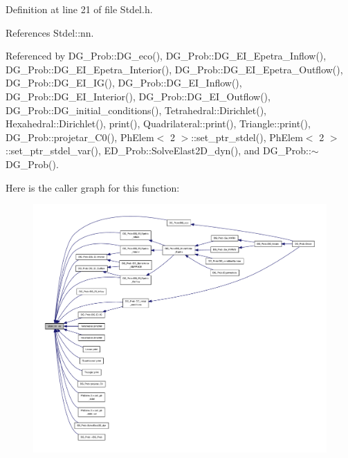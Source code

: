 Definition at line 21 of file Stdel.\+h.



References Stdel\+::nn.



Referenced by D\+G\+\_\+\+Prob\+::\+D\+G\+\_\+eco(), D\+G\+\_\+\+Prob\+::\+D\+G\+\_\+\+E\+I\+\_\+\+Epetra\+\_\+\+Inflow(), D\+G\+\_\+\+Prob\+::\+D\+G\+\_\+\+E\+I\+\_\+\+Epetra\+\_\+\+Interior(), D\+G\+\_\+\+Prob\+::\+D\+G\+\_\+\+E\+I\+\_\+\+Epetra\+\_\+\+Outflow(), D\+G\+\_\+\+Prob\+::\+D\+G\+\_\+\+E\+I\+\_\+\+I\+G(), D\+G\+\_\+\+Prob\+::\+D\+G\+\_\+\+E\+I\+\_\+\+Inflow(), D\+G\+\_\+\+Prob\+::\+D\+G\+\_\+\+E\+I\+\_\+\+Interior(), D\+G\+\_\+\+Prob\+::\+D\+G\+\_\+\+E\+I\+\_\+\+Outflow(), D\+G\+\_\+\+Prob\+::\+D\+G\+\_\+initial\+\_\+conditions(), Tetrahedral\+::\+Dirichlet(), Hexahedral\+::\+Dirichlet(), print(), Quadrilateral\+::print(), Triangle\+::print(), D\+G\+\_\+\+Prob\+::projetar\+\_\+\+C0(), Ph\+Elem$<$ 2 $>$\+::set\+\_\+ptr\+\_\+stdel(), Ph\+Elem$<$ 2 $>$\+::set\+\_\+ptr\+\_\+stdel\+\_\+var(), E\+D\+\_\+\+Prob\+::\+Solve\+Elast2\+D\+\_\+dyn(), and D\+G\+\_\+\+Prob\+::$\sim$\+D\+G\+\_\+\+Prob().

Here is the caller graph for this function\+:
\nopagebreak
\begin{figure}[H]
\begin{center}
\leavevmode
\includegraphics[width=350pt]{classStdel_a6086dceed8fe3dd410da0d6b84f02377_icgraph}
\end{center}
\end{figure}
\mbox{\label{classStdel_ae2ab461d1bc8d9f6006665fe03684845}} 
